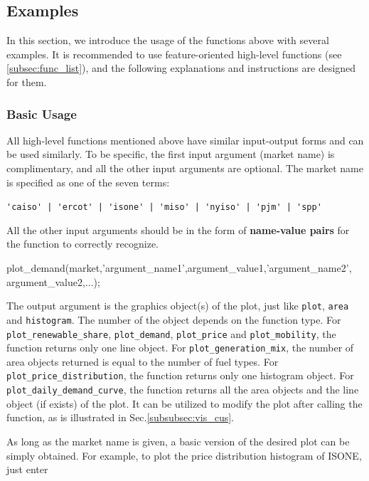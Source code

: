 \documentclass[10pt]{article}
\numberwithin{equation}{section}
\numberwithin{table}{section}
\numberwithin{figure}{section}
\begin{document}
\subsection{Examples}

In this section, we introduce the usage of the functions above with several examples. It is recommended to use feature-oriented high-level functions (see \ref{subsec:func_list}), and the following explanations and instructions are designed for them.

\subsubsection{Basic Usage} \label{subsubsec:vis_basic}

All high-level functions mentioned above have similar input-output forms and can be used similarly. To be specific, the first input argument (market name) is complimentary, and all the other input arguments are optional. The market name is specified as one of the seven terms:

\begin{center}
  \verb!'caiso' | 'ercot' | 'isone' | 'miso' | 'nyiso' | 'pjm' | 'spp'!
\end{center}

All the other input arguments should be in the form of \textbf{name-value pairs} for the function to correctly recognize.

\begin{Code}
plot_demand(market,'argument_name1',argument_value1,'argument_name2',
argument_value2,...);
\end{Code}

The output argument is the graphics object(s) of the plot, just like \verb!plot!, \verb!area! and \verb!histogram!. The number of the object depends on the function type. For \verb!plot_renewable_share!, \verb!plot_demand!, \verb!plot_price! and \verb!plot_mobility!, the function returns only one line object. For \verb!plot_generation_mix!, the number of area objects returned is equal to the number of fuel types. For \verb!plot_price_distribution!, the function returns only one histogram object. For \verb!plot_daily_demand_curve!, the function returns all the area objects and the line object (if exists) of the plot. It can be utilized to modify the plot after calling the function, as is illustrated in Sec.\ref{subsubsec:vis_cus}.

As long as the market name is given, a basic version of the desired plot can be simply obtained. For example, to plot the price distribution histogram of ISONE, just enter
\end{document}
